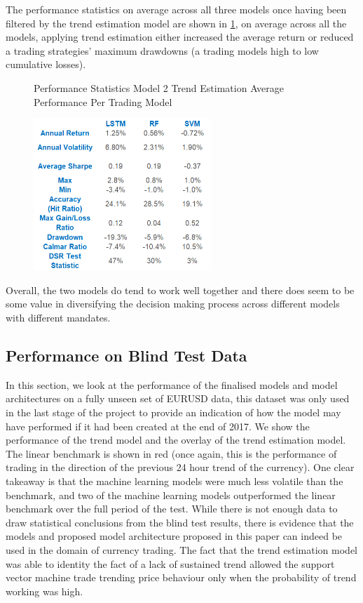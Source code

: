 \documentclass[11pt]{article}
\begin{document}
The performance statistics on average across all three models once having been filtered by the trend estimation model are shown in \ref{fig:TrendEstimationSTATS}, on average across all the models, applying trend estimation either increased the average return or reduced a trading strategies' maximum drawdowns (a trading models high to low cumulative losses).
\begin{figure}[h]
    \centering
	\caption{Performance Statistics Model 2 Trend Estimation Average Performance Per Trading Model}    
	\includegraphics[width=0.6\textwidth]{TrendEstimationSTATSv2}
    \label{fig:TrendEstimationSTATS}
     \caption*{}
\end{figure}

Overall, the two models do tend to work well together and there does seem to be some value in diversifying the decision making process across different models with different mandates.

\subsection{Performance on Blind Test Data}
In this section, we look at the performance of the finalised models and model architectures on a fully unseen set of EURUSD data, this dataset was only used in the last stage of the project to provide an indication of how the model may have performed if it had been created at the end of 2017. We show the performance of the trend model and the overlay of the trend estimation model. The linear benchmark is shown in red (once again, this is the performance of trading in the direction of the previous 24 hour trend of the currency). One clear takeaway is that the machine learning models were much less volatile than the benchmark, and two of the machine learning models outperformed the linear benchmark over the full period of the test. While there is not enough data to draw statistical conclusions from the blind test results, there is evidence that the models and proposed model architecture proposed in this paper can indeed be used in the domain of currency trading. The fact that the trend estimation model was able to identity the fact of a lack of sustained trend allowed the support vector machine trade trending price behaviour only when the probability of trend working was high.
\end{document}
